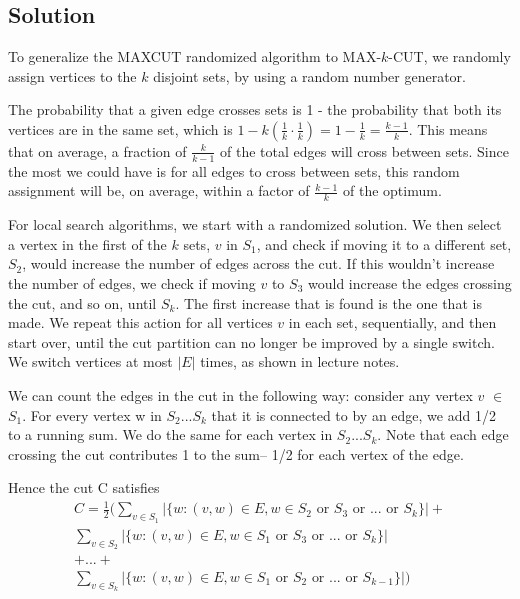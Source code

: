 \documentclass[11pt]{article}
\begin{document}
\subsection{Solution}
To generalize the MAXCUT randomized algorithm to MAX-$k$-CUT, we randomly assign vertices to the $k$ disjoint sets, by using a random number generator. 

The probability that a given edge crosses sets is 1 - the probability that both its vertices are in the same set, which is $1- k(\frac{1}{k}\cdot\frac{1}{k})= 1 - \frac{1}{k} = \frac{k-1}{k}$. This means that on average, a fraction of $\frac{k}{k-1}$ of the total edges will cross between sets. Since the most we could have is for all edges to cross between sets, this random assignment will be, on average, within a factor of $\frac{k-1}{k}$ of the optimum.

For local search algorithms, we start with a randomized solution. We then select a vertex in the first of the $k$ sets, $v$ in $S_1$, and check if moving it to a different set, $S_2$, would increase the number of edges across the cut. If this wouldn't increase the number of edges, we check if moving $v$ to $S_3$ would increase the edges crossing the cut, and so on, until $S_k$. The first increase that is found is the one that is made. We repeat this action for all vertices $v$ in each set, sequentially, and then start over, until the cut partition can no longer be improved by a single switch. We switch vertices at most $|E|$ times, as shown in lecture notes. 

We can count the edges in the cut in the following way: consider any vertex $v$ $\in$ $S_1$. For every vertex w in $S_2...S_k$ that it is connected to by an edge, we add 1/2 to a running sum. We do the same for each vertex in $S_2...S_k$. Note that each edge crossing the cut contributes 1 to the sum– 1/2 for each vertex of the edge.

Hence the cut C satisfies
\begin{multline*}
	C= \frac{1}{2} (\sum_{v\in S_1}|\{w:(v,w)\in E, w \in S_2 \text{ or } S_3 \text{ or } ... \text{ or } S_k\}|+ \\
	\sum_{v\in S_2}|\{w:(v,w) \in E, w \in S_1\text{ or } S_3 \text{ or } ... \text{ or } S_k\}| \\
	+ ... + \\ 
	\sum_{v\in S_k}|\{w:(v,w) \in E, w \in S_1\text{ or } S_2 \text{ or } ... \text{ or } S_{k-1}\}|)
\end{multline*}
\end{document}

